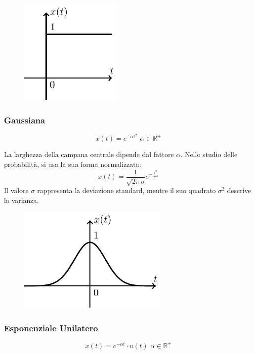 \documentclass{article}
\numberwithin{equation}{subsection}
\begin{document}
\begin{figure}[H]%
    \centering
    \includegraphics{gradino.pdf}%
\end{figure}

\subsubsection{Gaussiana}

\begin{equation}
    x(t)=e^{-\alpha t^2}\,\,\alpha\in\mathbb{R}^+
\end{equation}

La larghezza della campana centrale dipende dal fattore $\alpha$. Nello studio delle probabilità, si usa la sua forma normalizzata:
\begin{equation*}
    x(t)=\displaystyle\frac{1}{\sqrt{2\pi}\sigma}e^{-\frac{t^2}{2\sigma^2}}
\end{equation*}
Il valore $\sigma$ rappresenta la deviazione standard, mentre il suo quadrato $\sigma^2$ descrive la varianza. 

\begin{figure}[H]%
    \centering
    \includegraphics{gaussiana.pdf}%
\end{figure}

\subsubsection{Esponenziale Unilatero}

\begin{equation}
    x(t)=e^{-\alpha t}\cdot u(t)\,\,\alpha\in\mathbb{R}^+
\end{equation}
\end{document}
